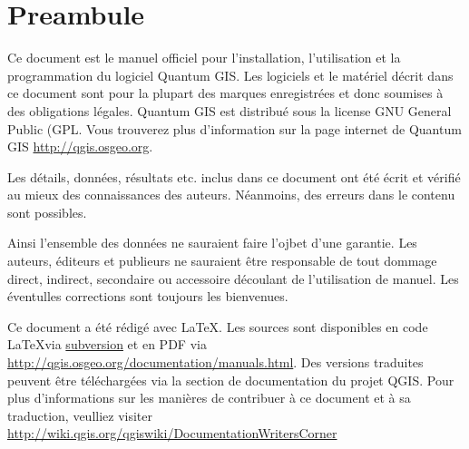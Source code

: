 \newcommand\qgistip[1]{\raggedright\small{#1}}
\renewcommand{\topfraction}{0.85}
\renewcommand{\textfraction}{0.1}
\renewcommand{\floatpagefraction}{0.75}

\thispagestyle{empty}

\section*{Preambule}


\vspace{1cm}


Ce document est le manuel officiel pour l'installation, l'utilisation et la programmation du logiciel Quantum GIS. Les logiciels et le matériel décrit dans ce document sont pour la plupart des marques enregistrées et donc soumises à des obligations légales. Quantum GIS est distribué sous la license GNU General Public  (GPL. Vous trouverez plus d'information sur la page internet de Quantum GIS \url{http://qgis.osgeo.org}.

Les détails, données, résultats etc. inclus dans ce document ont été écrit et vérifié au mieux des connaissances des auteurs. Néanmoins, des erreurs dans le contenu sont possibles.

Ainsi l'ensemble des données ne sauraient faire l'ojbet d'une garantie. Les auteurs, éditeurs et publieurs ne sauraient être responsable de tout dommage direct, indirect, secondaire ou accessoire découlant de l'utilisation de manuel. Les éventulles corrections sont toujours les bienvenues.

Ce document a été rédigé avec \LaTeX. Les sources sont disponibles en code \LaTeX via \href{http://wiki.qgis.org/qgiswiki/DocumentationWritersCorner}{subversion} et en PDF via \url{http://qgis.osgeo.org/documentation/manuals.html}. 
Des versions traduites peuvent être téléchargées via la section de documentation du projet QGIS. Pour plus d'informations sur les manières de contribuer à ce document et à sa traduction, veulliez visiter \url{http://wiki.qgis.org/qgiswiki/DocumentationWritersCorner} 

